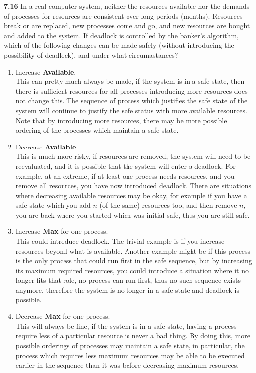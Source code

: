 \documentclass[12pt]{jhwhw}
\begin{document}
\clearpage
\textbf{7.16}  
	In a real computer system, neither the resources available nor the demands of processes for resources are 
	consistent over long periods (months). Resources break or are replaced, new processes come and go, and new 
	resources are bought and added to the system. If deadlock is controlled by the banker's algorithm,
	which of the following changes can be made safely (without introducing the possibility of deadlock),
	and under what circumastances?
	\begin{enumerate}
		\item Increase \textbf{Available}. \\
			This can pretty much always be made, if the system is in a safe state, then there
			is sufficient resources for all processes introducing more resources does not change this.
			The sequence of process which justifies the safe state of the system will continue
			to justify the safe status with more available resources.
			Note that by introducing more resources, there may be more possible ordering of the processes
			which maintain a safe state.
		\item Decrease \textbf{Available}. \\
			This is much more risky, if resources are removed, the system will need to be reevaluated,
			and it is possible that the system will enter a deadlock. For example, at an extreme, if 
			at least one process needs resources, and you remove all resources, you have now introduced deadlock.
			There are situations where decreasing available resources may be okay, for example
			if you have a safe state which you add $n$ (of the same) resources too, and then remove $n$, you are back
			where you started which was initial safe, thus you are still safe.
		\item Increase \textbf{Max} for one process. \\
			This could introduce deadlock. The trivial example is if you increase resources beyond what is available.
			Another example might be if this process is the only process that could run first in the safe sequence,
			but by increasing its maximum required resources, you could introduce a situation where it no longer
			fits that role, no process can run first, thus no such sequence exists anymore, therefore
			the system is no longer in a safe state and deadlock is possible.
		\item Decrease \textbf{Max} for one process. \\
			This will always be fine, if the system is in a safe state, having a process require less
			of a particular resource is never a bad thing. By doing this, more possible orderings
			of processes may maintain a safe state, in particular, the process which requires less 
			maximum resources may be able to be executed earlier in the sequence than it was before
			decreasing maximum resources.
	\end{enumerate}
\end{document}
